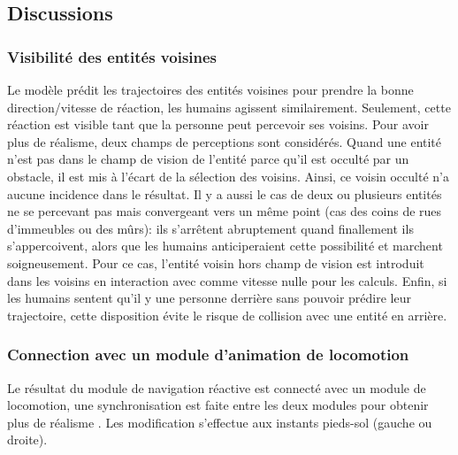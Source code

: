 \documentclass[11pt]{article}
\begin{document}
\subsection{Discussions}
\label{several-entities}

\subsubsection*{Visibilité des entités voisines}

Le modèle prédit les trajectoires des entités voisines pour prendre la bonne direction/vitesse de réaction, les humains agissent similairement. Seulement, cette réaction est visible tant que la personne peut percevoir ses voisins. Pour avoir plus de réalisme, deux champs de perceptions sont considérés. Quand une entité n'est pas dans le champ de vision de l'entité parce qu'il est occulté par un obstacle, il est mis à l'écart de la sélection des voisins. Ainsi, ce voisin occulté n'a aucune incidence dans le résultat. Il y a aussi le cas de deux ou plusieurs entités ne se percevant pas mais convergeant vers un même point (cas des coins de rues d'immeubles ou des mûrs): ils s'arrêtent abruptement quand finallement ils s'appercoivent, alors que les humains anticiperaient cette possibilité et marchent soigneusement. Pour ce cas, l'entité voisin hors champ de vision est introduit dans les voisins en interaction avec comme vitesse nulle pour les calculs. Enfin, si les humains sentent qu'il y une personne derrière sans pouvoir prédire leur trajectoire, cette disposition évite le risque de collision avec une entité en arrière.

\subsubsection*{Connection avec un module d'animation de locomotion} 

Le résultat du module de navigation réactive est connecté avec un module de locomotion, une synchronisation est faite entre les deux modules pour obtenir plus de réalisme . Les modification s'effectue aux instants pieds-sol (gauche ou droite).
\end{document}
